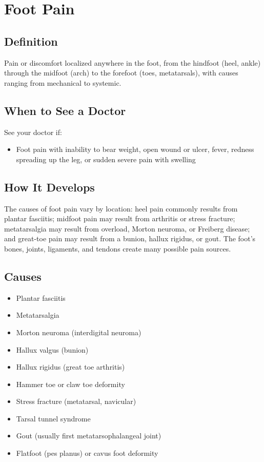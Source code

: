 \chapter{Foot Pain}

\section*{Definition}
Pain or discomfort localized anywhere in the foot, from the hindfoot (heel, ankle) through the midfoot (arch) to the forefoot (toes, metatarsals), with causes ranging from mechanical to systemic.

\section*{When to See a Doctor}
See your doctor if:
\begin{itemize}
  \item Foot pain with inability to bear weight, open wound or ulcer, fever, redness spreading up the leg, or sudden severe pain with swelling
\end{itemize}

\section*{How It Develops}
The causes of foot pain vary by location: heel pain commonly results from plantar fasciitis; midfoot pain may result from arthritis or stress fracture; metatarsalgia may result from overload, Morton neuroma, or Freiberg disease; and great-toe pain may result from a bunion, hallux rigidus, or gout. The foot's bones, joints, ligaments, and tendons create many possible pain sources.

\section*{Causes}
\begin{itemize}
  \item Plantar fasciitis
  \item Metatarsalgia
  \item Morton neuroma (interdigital neuroma)
  \item Hallux valgus (bunion)
  \item Hallux rigidus (great toe arthritis)
  \item Hammer toe or claw toe deformity
  \item Stress fracture (metatarsal, navicular)
  \item Tarsal tunnel syndrome
  \item Gout (usually first metatarsophalangeal joint)
  \item Flatfoot (pes planus) or cavus foot deformity
\end{itemize}

